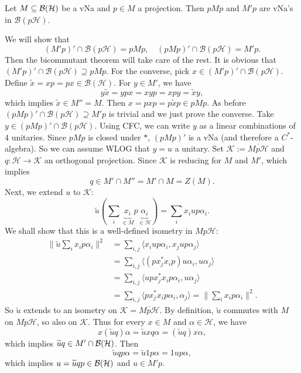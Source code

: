 \begin{theorem}
  Let $M \subseteq \operatorname{\mathcal{B} (\mathcal{H})}$ be a vNa and $p \in M$ a projection.
  Then $p M p$ and $M' p$ are vNa's in $\mathcal{B}(p \mathcal{H})$.
\end{theorem}

\begin{myproof}
  We will show that 
  $$(M' p)' \cap \mathcal{B} (p\mathcal{H}) = pM p,\quad (p M p)' \cap \mathcal{B} (p\mathcal{H}) = M' p.$$
  Then the bicommutant theorem will take care of the rest. 
  It is obvious that $(M' p)' \cap \mathcal{B} (p\mathcal{H}) \supseteq pM p$.
  For the converse, pick $x \in (M' p)' \cap \mathcal{B} (p\mathcal{H})$.
  Define $\widetilde{x} = xp = px  \in \mathcal{B}(\mathcal{H})$.
  For $y \in M'$, we have 
  $$y \widetilde{x} = ypx = xyp = xpy = \widetilde{x} y,$$
  which implies $\widetilde{x} \in M'' = M$.
  Then $x = pxp = p\widetilde{x}p \in pMp$.
  As before $(p M p)' \cap \mathcal{B} (p\mathcal{H}) \supseteq M' p$
  is trivial and we just prove the converse. Take $y \in (pMp)' \cap \mathcal{B}(p\mathcal{H})$. Using CFC, we can write $y$ as 
  a linear combinations of $4$ unitaries. Since $pMp$ is closed under $*$,
  $(pM p)'$ is a vNa (and therefore a $C^*$-algebra). So we can assume WLOG that $y = u$ a unitary.
  Set $\mathcal{K} := \overline{M p \mathcal{H}}$ and $q: \mathcal{H} \to \mathcal{K}$ an orthogonal projection.
  Since $\mathcal{K}$ is reducing for $M$ and $M'$, which implies 
  $$q \in M' \cap M'' = M' \cap M = Z(M).$$
  Next, we extend $u$ to $\mathcal{K}$:
  $$\widetilde{u} (\sum_i \underbrace{x_i}_{\in M} p \underbrace{\alpha_i}_{\in \mathcal{H}}) = \sum_i x_i u p \alpha_i.$$
  We shall show that this is a well-defined isometry in $Mp\mathcal{H}$:
  \begin{align*}
    \| \widetilde{u} \sum_i x_i p \alpha_i \|^2 &= \sum_{i, j} \langle x_i u p \alpha_i, x_j u p \alpha_j \rangle\\
     &= \sum_{i, j} \langle(p x_j^* x_i p) u \alpha_i, u\alpha_j \rangle\\
     &= \sum_{i, j} \langle u p x_j^* x_i p \alpha_i, u\alpha_j \rangle\\ 
     &= \sum_{i, j} \langle p x_j^* x_i p \alpha_i, \alpha_j \rangle = \| \sum_i x_i p \alpha_i\|^2. 
  \end{align*}
  So $\widetilde{u}$ extends to an isometry on $\mathcal{K} = \overline{M p \mathcal{H}}$.
  By definition, $\widetilde{u}$ commutes with $M$ on $M p \mathcal{H}$, so also on $\mathcal{K}$.
  Thus for every $x \in M$ and $\alpha \in \mathcal{H}$, we have 
  $$x (\widetilde{u} q) \alpha = \widetilde{u} x q \alpha = (\widetilde{u} q)x \alpha,$$
  which implies $\widetilde{u} q \in M' \cap \operatorname{\mathcal{B} (\mathcal{H})}$.
  Then $$\widetilde{u} qp \alpha = \widetilde{u} 1 p \alpha = 1 u p \alpha,$$
  which implies 
  $u = \widetilde{u} q p \in \operatorname{\mathcal{B} (\mathcal{H})}$
  and $u \in M'p$. 
\end{myproof}

